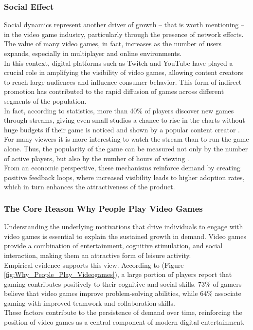 \subsubsection{Social Effect}
Social dynamics represent another driver of growth -- that is worth mentioning -- in the video game industry, particularly through the presence of network effects. The value of many video games, in fact, increases as the number of users expands, especially in multiplayer and online environments.
\\
In this context, digital platforms such as Twitch and YouTube have played a crucial role in amplifying the visibility of video games, allowing content creators to reach large audiences and influence consumer behavior. This form of indirect promotion has contributed to the rapid diffusion of games across different segments of the population.\\
In fact, according to statistics, more than 40\% of players discover new games through streams, giving even small studios a chance to rise in the charts without huge budgets if their game is noticed and shown by a popular content creator \citep{streaming_game_popularity, impact_game_streaming_industry}. \\
For many viewers it is more interesting to watch the stream than to run the game alone. Thus, the popularity of the game can be measured not only by the number of active players, but also by the number of hours of viewing \citep{streaming_game_popularity} .
\\
From an economic perspective, these mechanisms reinforce demand by creating positive feedback loops, where increased visibility leads to higher adoption rates, which in turn enhances the attractiveness of the product.

 

\subsubsection{The Core Reason Why People Play Video Games}

Understanding the underlying motivations that drive individuals to engage with video games is essential to explain the sustained growth in demand. Video games provide a combination of entertainment, cognitive stimulation, and social interaction, making them an attractive form of leisure activity.
\\
Empirical evidence supports this view. According to \cite{esa2024} (Figure \ref{fig:Why_People_Play_Videogames}), a large portion of players report that gaming contributes positively to their cognitive and social skills. 73\% of gamers believe that video games improve problem-solving abilities, while 64\% associate gaming with improved teamwork and collaboration skills.\\
These factors contribute to the persistence of demand over time, reinforcing the position of video games as a central component of modern digital entertainment.

